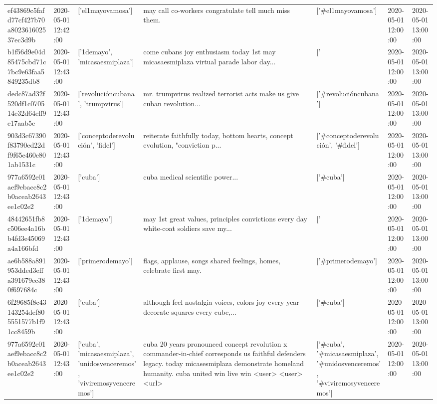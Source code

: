 \begin{tabular}{lllllll}
ef43869c5fafd77cf427b70a802361602537ec3d9b & 2020-05-01 12:42:00 & ['el1mayovamosa'] & may call co-workers congratulate tell much miss them. & ['#el1mayovamosa'] & 2020-05-01 12:00:00 & 2020-05-01 13:00:00 \\
b1f56d9e04d85475cbd71c7bc9e63faa5849235db8 & 2020-05-01 12:43:00 & ['1demayo', 'micasaesmiplaza'] & come cubans joy enthusiasm today 1st may micasaesmiplaza virtual parade labor day... & ['#1demayo', '#micasaesmiplaza'] & 2020-05-01 12:00:00 & 2020-05-01 13:00:00 \\
dedc87ad32f520df1c070514e32d64eff9e17aab5c & 2020-05-01 12:43:00 & ['revolucióncubana', 'trumpvirus'] & mr. trumpvirus realized terrorist acts make us give cuban revolution... & ['#revolucióncubana'] & 2020-05-01 12:00:00 & 2020-05-01 13:00:00 \\
903d3c67390f83790ed22df9f65e460e801ab1531c & 2020-05-01 12:43:00 & ['conceptoderevolución', 'fidel'] & reiterate faithfully today, bottom hearts, concept evolution, "conviction p... & ['#conceptoderevolución', '#fidel'] & 2020-05-01 12:00:00 & 2020-05-01 13:00:00 \\
977a6592e01aef9ebacc8c2b0aceab2643ee1c02e2 & 2020-05-01 12:43:00 & ['cuba'] & cuba medical scientific power... & ['#cuba'] & 2020-05-01 12:00:00 & 2020-05-01 13:00:00 \\
48442651fb8c506ee4a16bb4fd3e45069a4a166bfd & 2020-05-01 12:43:00 & ['1demayo'] & may 1st great values, principles convictions every day white-coat soldiers save my... & ['#1demayo'] & 2020-05-01 12:00:00 & 2020-05-01 13:00:00 \\
ae6b588a891953dded3effa391679ec380f697684c & 2020-05-01 12:43:00 & ['primerodemayo'] & flags, applause, songs shared feelings, homes, celebrate first may. & ['#primerodemayo'] & 2020-05-01 12:00:00 & 2020-05-01 13:00:00 \\
6f29685f8c43143254def805551577b1f91cc8459b & 2020-05-01 12:43:00 & ['cuba'] & although feel nostalgia voices, colors joy every year decorate squares every cube,... & ['#cuba'] & 2020-05-01 12:00:00 & 2020-05-01 13:00:00 \\
977a6592e01aef9ebacc8c2b0aceab2643ee1c02e2 & 2020-05-01 12:43:00 & ['cuba', 'micasaesmiplaza', 'unidosvenceremos', 'viviremosyvenceremos'] & cuba 20 years pronounced concept revolution x commander-in-chief corresponds us faithful defenders legacy. today micasesmiplaza demonstrate homeland humanity. cuba united win live win <user> <user> <url> & ['#cuba', '#micasaesmiplaza', '#unidosvenceremos', '#viviremosyvenceremos'] & 2020-05-01 12:00:00 & 2020-05-01 13:00:00 \\

\end{tabular}

